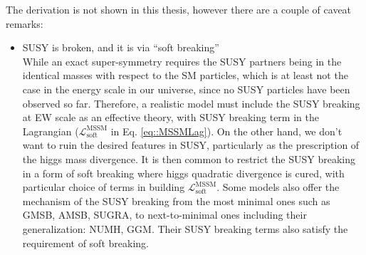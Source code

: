 The derivation is not shown in this thesis, however there are a couple of caveat remarks:
\begin{itemize}
\item SUSY is broken, and it is via ``soft breaking'' \\
While an exact super-symmetry requires the SUSY partners being in the identical masses with respect to the SM particles, which is at least not the case in the energy scale in our universe, since no SUSY particles have been observed so far. Therefore, a realistic model must include the SUSY breaking at EW scale as an effective theory, with SUSY breaking term in the Lagrangian ($\mathcal{L}^{\mathrm{MSSM}}_{\mathrm{soft}}$ in Eq. \ref{eq::MSSMLag}). On the other hand, we don't want to ruin the desired features in SUSY, particularly as the prescription of the higgs mass divergence. It is then common to restrict the SUSY breaking in a form of soft breaking where higgs quadratic divergence is cured, with particular choice of terms in building $\mathcal{L}^{\mathrm{MSSM}}_{\mathrm{soft}}$.
%
Some models also offer the mechanism of the SUSY breaking from the most minimal ones such as GMSB, AMSB, SUGRA, to next-to-minimal ones including their generalization: NUMH, GGM. Their SUSY breaking terms also satisfy the requirement of soft breaking.



\end{itemize}
